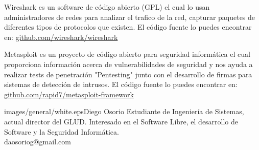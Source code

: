 \begin{multicols}{2}

Wireshark es un software de código abierto (GPL) el cual lo usan administradores de redes para analizar el trafico de la red, capturar paquetes de diferentes tipos de protocolos que existen. El código fuente lo puedes encontrar en: \href{https://github.com/wireshark/wireshark}{github.com/wireshark/wireshark}


Metasploit es un proyecto de código abierto para seguridad informática el cual proporciona información acerca de vulnerabilidades de seguridad y nos ayuda a realizar tests de penetración "Pentesting" junto con el desarrollo de firmas para sistemas de detección de intrusos. El código fuente lo puedes encontrar en:  \href{https://github.com/rapid7/metasploit-framework}{github.com/rapid7/metasploit-framework}


\medskip



\begin{biografia}{images/general/white.eps}{Diego Osorio} 
Estudiante de Ingeniería de Sistemas, actual director del GLUD. Interesado en el Software Libre, el desarrollo de Software y la Seguridad Informática.\\daosoriog@gmail.com
\end{biografia}


\end{multicols}
